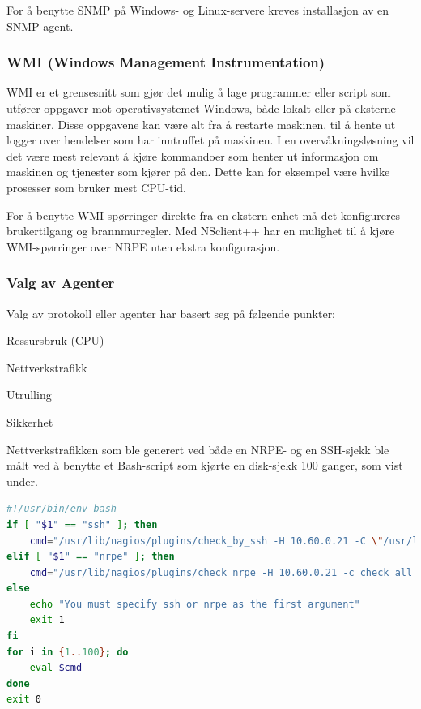 For å benytte SNMP på Windows- og Linux-servere kreves installasjon av en SNMP-agent\cite{mssnmp,netsnmp}.

\subsubsection{WMI (Windows Management Instrumentation)}
WMI er et grensesnitt som gjør det mulig å lage programmer eller script som utfører oppgaver mot operativsystemet Windows, både lokalt eller på eksterne maskiner. Disse oppgavene kan være alt fra å restarte maskinen, til å hente ut logger over hendelser som har inntruffet på maskinen. I en overvåkningsløsning vil det være mest relevant å kjøre kommandoer som henter ut informasjon om maskinen og tjenester som kjører på den. Dette kan for eksempel være hvilke prosesser som bruker mest CPU-tid.

For å benytte WMI-spørringer direkte fra en ekstern enhet må det konfigureres brukertilgang og brannmurregler\cite{wmiremote}. Med NSclient++ har en mulighet til å kjøre WMI-spørringer over NRPE uten ekstra konfigurasjon.

\clearpage
\subsubsection{Valg av Agenter}
Valg av protokoll eller agenter har basert seg på følgende punkter:
\begin{itemize*}
	\item Ressursbruk (CPU)
	\item Nettverkstrafikk
	\item Utrulling
	\item Sikkerhet
\end{itemize*}
Nettverkstrafikken som ble generert ved både en NRPE- og en SSH-sjekk ble målt ved å benytte et Bash-script som kjørte en disk-sjekk 100 ganger, som vist under. 

\begin{lstlisting}[language=bash]
#!/usr/bin/env bash
if [ "$1" == "ssh" ]; then
    cmd="/usr/lib/nagios/plugins/check_by_ssh -H 10.60.0.21 -C \"/usr/lib/nagios/plugins/check_disk -W 10% -C 5% -M -A\" > /dev/null"
elif [ "$1" == "nrpe" ]; then
    cmd="/usr/lib/nagios/plugins/check_nrpe -H 10.60.0.21 -c check_all_mounts -a 10,5 > /dev/null"
else
    echo "You must specify ssh or nrpe as the first argument"
    exit 1
fi
for i in {1..100}; do
    eval $cmd
done
exit 0
\end{lstlisting}

